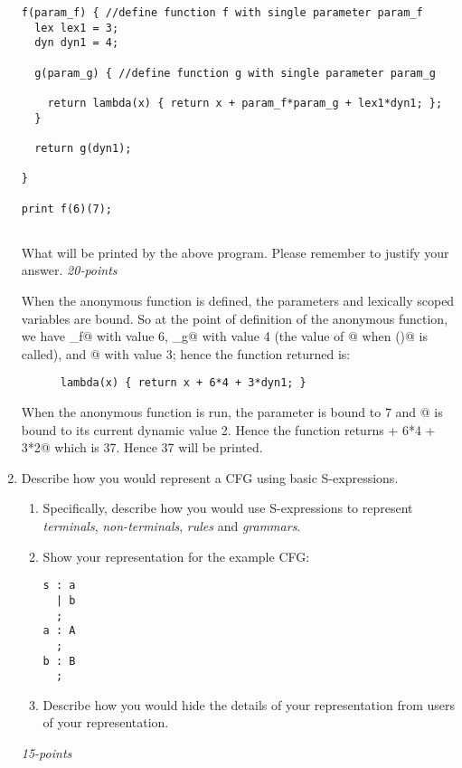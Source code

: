 \documentclass[12pt]{article}
\begin{document}
\begin{enumerate}
\begin{verbatim}
f(param_f) { //define function f with single parameter param_f
  lex lex1 = 3; 
  dyn dyn1 = 4;

  g(param_g) { //define function g with single parameter param_g

    return lambda(x) { return x + param_f*param_g + lex1*dyn1; };
  }

  return g(dyn1);

}

print f(6)(7);
  
\end{verbatim}


What will be printed by the above program.  Please remember to justify
your answer.  \hfill\textit{20-points}

When the anonymous function is defined, the parameters and lexically
scoped variables are bound. So at the point of definition of the
anonymous function, we have \verb@param_f@ with value 6,
\verb@param_g@ with value 4 (the value of @ when
\verb@g()@ is called), and @ with value 3; hence the function
returned is:

\begin{verbatim}
      lambda(x) { return x + 6*4 + 3*dyn1; }
\end{verbatim}

When the anonymous function is run, the parameter \verb@x@ is bound to
7 and @ is bound to its current dynamic value 2.  Hence the
function returns  + 6*4 + 3*2@ which is 37.  Hence 37 will be
printed.

\item Describe how you would represent a CFG using basic
  S-expressions.

\begin{enumerate}  
  \item Specifically, describe how you would use
  S-expressions to represent \textit{terminals},
  \textit{non-terminals}, \textit{rules} and \textit{grammars}.

  \item Show your representation for the example CFG:
\begin{verbatim}
s : a
  | b
  ;
a : A
  ;
b : B
  ;
\end{verbatim}

  \item Describe how you would hide the details of your representation from
    users of your representation.

\end{enumerate}
\hfill\textit{15-points}


\end{enumerate}
\end{document}
